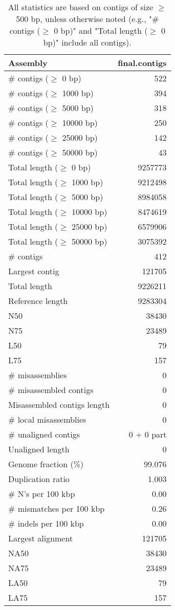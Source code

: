 \documentclass[12pt,a4paper]{article}
\begin{document}
\begin{table}[ht]
\begin{center}
\caption{All statistics are based on contigs of size $\geq$ 500 bp, unless otherwise noted (e.g., "\# contigs ($\geq$ 0 bp)" and "Total length ($\geq$ 0 bp)" include all contigs).}
\begin{tabular}{|l*{1}{|r}|}
\hline
Assembly & final.contigs \\ \hline
\# contigs ($\geq$ 0 bp) & 522 \\ \hline
\# contigs ($\geq$ 1000 bp) & 394 \\ \hline
\# contigs ($\geq$ 5000 bp) & 318 \\ \hline
\# contigs ($\geq$ 10000 bp) & 250 \\ \hline
\# contigs ($\geq$ 25000 bp) & 142 \\ \hline
\# contigs ($\geq$ 50000 bp) & 43 \\ \hline
Total length ($\geq$ 0 bp) & 9257773 \\ \hline
Total length ($\geq$ 1000 bp) & 9212498 \\ \hline
Total length ($\geq$ 5000 bp) & 8984058 \\ \hline
Total length ($\geq$ 10000 bp) & 8474619 \\ \hline
Total length ($\geq$ 25000 bp) & 6579906 \\ \hline
Total length ($\geq$ 50000 bp) & 3075392 \\ \hline
\# contigs & 412 \\ \hline
Largest contig & 121705 \\ \hline
Total length & 9226211 \\ \hline
Reference length & 9283304 \\ \hline
N50 & 38430 \\ \hline
N75 & 23489 \\ \hline
L50 & 79 \\ \hline
L75 & 157 \\ \hline
\# misassemblies & 0 \\ \hline
\# misassembled contigs & 0 \\ \hline
Misassembled contigs length & 0 \\ \hline
\# local misassemblies & 0 \\ \hline
\# unaligned contigs & 0 + 0 part \\ \hline
Unaligned length & 0 \\ \hline
Genome fraction (\%) & 99.076 \\ \hline
Duplication ratio & 1.003 \\ \hline
\# N's per 100 kbp & 0.00 \\ \hline
\# mismatches per 100 kbp & 0.26 \\ \hline
\# indels per 100 kbp & 0.00 \\ \hline
Largest alignment & 121705 \\ \hline
NA50 & 38430 \\ \hline
NA75 & 23489 \\ \hline
LA50 & 79 \\ \hline
LA75 & 157 \\ \hline
\end{tabular}
\end{center}
\end{table}
\end{document}
